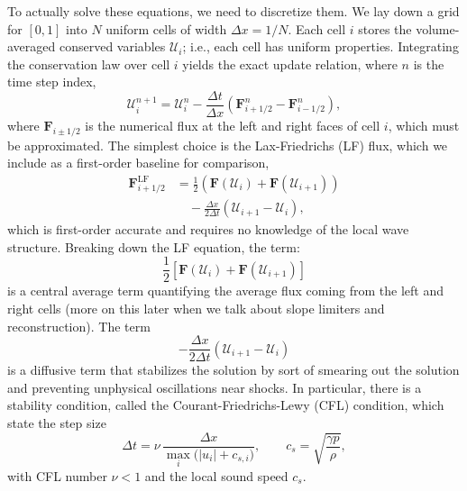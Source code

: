 \documentclass[12pt]{article}
\begin{document}
To actually solve these equations, we need to discretize them. We lay down a grid for $[0,1]$ into $N$ uniform cells of width $\Delta x = 1/N$. Each cell $i$ stores the volume-averaged conserved variables $\mathcal{U}_i$; i.e., each cell has uniform properties. Integrating the conservation law over cell $i$ yields the exact update relation, where $n$ is the time step index,
\begin{equation}
    \mathcal{U}_i^{n+1} = \mathcal{U}_i^{n}
    - \frac{\Delta t}{\Delta x}\!\left(\mathbf{F}^{n}_{i+1/2} - \mathbf{F}^{n}_{i-1/2}\right),
\label{eq:fv_update}
\end{equation}
where $\mathbf{F}_{i\pm 1/2}$ is the numerical flux at the left and right faces of cell $i$, which must be approximated. The simplest choice is the Lax-Friedrichs (LF) flux, which we include as a first-order baseline for comparison,
\begin{equation}
\begin{split}
    \mathbf{F}_{i+1/2}^{\mathrm{LF}} &= \frac{1}{2}\!\left(\mathbf{F}(\mathcal{U}_i) + \mathbf{F}(\mathcal{U}_{i+1})\right)\\
    &\quad - \frac{\Delta x}{2\Delta t}\!\left(\mathcal{U}_{i+1} - \mathcal{U}_i\right),
\end{split}
\end{equation}
which is first-order accurate and requires no knowledge of the local wave structure. Breaking down the LF equation, the term:
\begin{equation}
    \frac{1}{2}\!\left[\mathbf{F}(\mathcal{U}_i) + \mathbf{F}(\mathcal{U}_{i+1})\right]
\end{equation}
is a central average term quantifying the average flux coming from the left and right cells (more on this later when we talk about slope limiters and reconstruction). The term
\begin{equation}
    - \frac{\Delta x}{2\Delta t}\!\left(\mathcal{U}_{i+1} - \mathcal{U}_i\right)
\end{equation}
is a diffusive term that stabilizes the solution by sort of smearing out the solution and preventing unphysical oscillations near shocks. In particular, there is a stability condition, called the Courant-Friedrichs-Lewy (CFL) condition, which state the step size
\begin{equation}
    \Delta t = \nu\,\frac{\Delta x}{\displaystyle\max_i\!\bigl(|u_i| + c_{s,i}\bigr)},
    \qquad c_s = \sqrt{\frac{\gamma p}{\rho}},
\end{equation}
\citep{courant1928partiellen} with CFL number $\nu < 1$ and the local sound speed $c_s$. 
\end{document}
